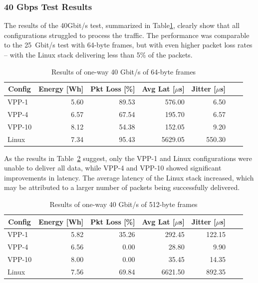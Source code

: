 \subsubsection{40 Gbps Test Results}

The results of the 40Gbit/s test, summarized in Table\ref{tab:40udp:64B}, clearly show that all configurations struggled to process the traffic.
The performance was comparable to the 25~Gbit/s test with 64-byte frames, but with even higher packet loss rates -- with the Linux stack delivering less than 5\% of the packets.

\begin{table}[h!]
\centering
\caption{Results of one-way 40 Gbit/s of 64-byte frames}
\begin{tabular}{|l|r|r|r|r|r|r|}
\hline
\multicolumn{1}{|c|}{\textbf{Config}} &
\multicolumn{1}{c|}{\textbf{Energy [Wh] }} &
\multicolumn{1}{c|}{\textbf{Pkt Loss [\%]}} &
\multicolumn{1}{c|}{\textbf{Avg Lat [$\mu$s]}} &
\multicolumn{1}{c|}{\textbf{Jitter [$\mu$s]}} \\
\hline 
VPP-1 & 5.60 & 89.53 & 576.00 & 6.50 \\
VPP-4 & 6.57 & 67.54 & 195.70 & 6.57 \\
VPP-10 & 8.12 & 54.38 & 152.05 & 9.20 \\
Linux & 7.34 & 95.43 & 5629.05 & 550.30 \\
\hline
\end{tabular}
\label{tab:40udp:64B}
\end{table}

As the results in Table~\ref{tab:40udp:512B} suggest, only the VPP-1 and Linux configurations were unable to deliver all data,
while VPP-4 and VPP-10 showed significant improvements in latency.
The average latency of the Linux stack increased, which may be attributed to a larger number of packets being successfully delivered.

\begin{table}[h!]
\centering
\caption{Results of one-way 40 Gbit/s of 512-byte frames}
\begin{tabular}{|l|r|r|r|r|r|r|}
\hline
\multicolumn{1}{|c|}{\textbf{Config}} &
\multicolumn{1}{c|}{\textbf{Energy [Wh] }} &
\multicolumn{1}{c|}{\textbf{Pkt Loss [\%]}} &
\multicolumn{1}{c|}{\textbf{Avg Lat [$\mu$s]}} &
\multicolumn{1}{c|}{\textbf{Jitter [$\mu$s]}} \\
\hline 
VPP-1 & 5.82 & 35.26 & 292.45 & 122.15 \\
VPP-4 & 6.56 & 0.00 & 28.80 & 9.90 \\
VPP-10 & 8.00 & 0.00 & 35.45 & 14.35 \\
Linux & 7.56 & 69.84 & 6621.50 & 892.35 \\
\hline
\end{tabular}
\label{tab:40udp:512B}
\end{table}

